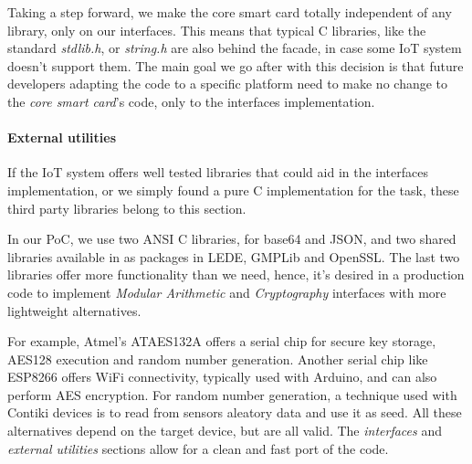 Taking a step forward, we make the core smart card totally independent of any library, only on our interfaces. This means that typical C libraries, like the standard \textit{stdlib.h}, or  \textit{string.h} are also behind the facade, in case some IoT system doesn't support them. The main goal we go after with this decision is that future developers adapting the code to a specific platform need to make no change to the \textit{core smart card}'s code, only to the interfaces implementation.



\paragraph{External utilities}

If the IoT system offers well tested libraries that could aid in the interfaces implementation, or we simply found a pure C implementation for the task, these third party libraries belong to this section.

In our PoC, we use two ANSI C libraries, for base64 and JSON, and two shared libraries available in as packages in LEDE, GMPLib and OpenSSL. The last two libraries offer more functionality than we need, hence, it's desired in a production code to implement \textit{Modular Arithmetic} and \textit{Cryptography} interfaces with more lightweight alternatives.

For example, Atmel's ATAES132A \citep{ATAES132A}
offers a serial chip for secure key storage, AES128 execution and random number generation. Another serial chip like ESP8266 offers WiFi connectivity, typically used with Arduino, and can also perform AES encryption. For random number generation, a technique used with Contiki devices is to read from sensors aleatory data and use it as seed. All these alternatives depend on the target device, but are all valid. The \textit{interfaces} and \textit{external utilities} sections allow for a clean and fast port of the code.


